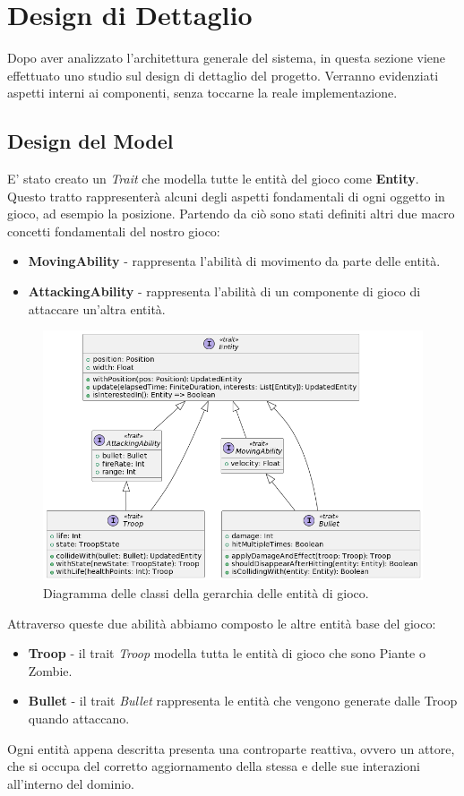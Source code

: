 \newpage
\section{Design di Dettaglio}
Dopo aver analizzato l'architettura generale del sistema, in questa sezione viene effettuato uno studio sul design
di dettaglio del progetto.
Verranno evidenziati aspetti interni ai componenti, senza toccarne la reale implementazione.

\subsection{Design del Model}
E' stato creato un \textit{Trait} che modella tutte le entità del gioco come \textbf{Entity}. Questo tratto rappresenterà
alcuni degli aspetti fondamentali di ogni oggetto in gioco, ad esempio la posizione. Partendo da ciò sono stati definiti
altri due macro concetti fondamentali del nostro gioco:
\begin{itemize}
    \item \textbf{MovingAbility} - rappresenta l'abilità di movimento da parte delle entità.
    \item \textbf{AttackingAbility} - rappresenta l'abilità di un componente di gioco di attaccare un'altra entità.
\end{itemize}
\begin{figure}[H]
    \centering
    \includegraphics[width=\linewidth]{images/model-desing}
    \caption{Diagramma delle classi della gerarchia delle entità di gioco.}
\end{figure}
Attraverso queste due abilità abbiamo composto le altre entità base del gioco:
\begin{itemize}
    \item \textbf{Troop} - il trait \textit{Troop} modella tutta le entità di gioco che sono Piante o Zombie.
    \item \textbf{Bullet} - il trait \textit{Bullet} rappresenta le entità che vengono generate dalle Troop quando
    attaccano.
\end{itemize}
Ogni entità appena descritta presenta una controparte
reattiva, ovvero un attore, che si occupa del corretto aggiornamento della stessa e delle sue
interazioni all’interno del dominio.\\

